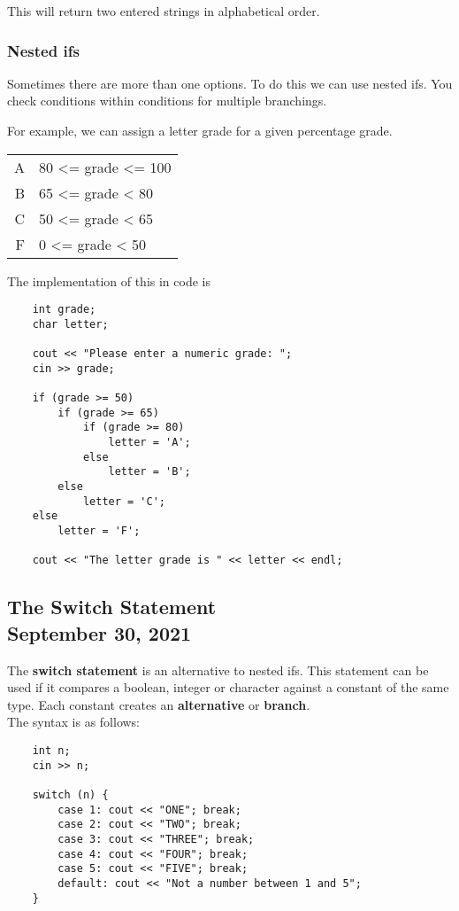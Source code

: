 \documentclass[]{article}
\begin{document}
This will return two entered strings in alphabetical order.


\subsubsection{Nested ifs}


Sometimes there are more than one options. To do this we can use nested ifs. You check conditions within conditions for multiple branchings.

For example, we can assign a letter grade for a given percentage grade. 

\begin{center}
	\begin{tabular}{rl}
		A & 80 <= grade <= 100 \\
		B & 65 <= grade < 80 \\
		C & 50 <= grade < 65 \\
		F & 0 <= grade < 50 \\
	\end{tabular}
\end{center}

The implementation of this in code is

\begin{lstlisting}
	int grade;
	char letter;
	
	cout << "Please enter a numeric grade: ";
	cin >> grade;
	
	if (grade >= 50)
		if (grade >= 65)
			if (grade >= 80)
				letter = 'A';
			else
				letter = 'B';
		else
			letter = 'C';
	else
		letter = 'F';
		
	cout << "The letter grade is " << letter << endl;
\end{lstlisting}


\subsection{The Switch Statement\\ {\large \normalfont September 30, 2021}}
\bigbreak

The \textbf{switch statement} is an alternative to nested ifs. This statement can be used if it compares a boolean, integer or character against a constant of the same type. Each constant creates an \textbf{alternative} or \textbf{branch}.\\

The syntax is as follows:

\begin{lstlisting}
	int n;
	cin >> n;
	
	switch (n) {
		case 1: cout << "ONE"; break;
		case 2: cout << "TWO"; break;
		case 3: cout << "THREE"; break;
		case 4: cout << "FOUR"; break;
		case 5: cout << "FIVE"; break;
		default: cout << "Not a number between 1 and 5";
	}
\end{lstlisting}\bigbreak
\end{document}
